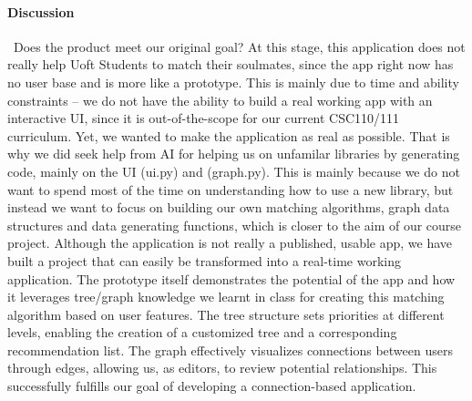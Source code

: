 \documentclass[fontsize=11pt]{article}
\begin{document}
\paragraph{Discussion}
\ Does the product meet our original goal?
At this stage, this application does not really help Uoft Students to match their soulmates, since the app right now has no user base and is more like a prototype.
This is mainly due to time and ability constraints -- we do not have the ability to build a real working app with an interactive UI, since it is out-of-the-scope for our current CSC110/111 curriculum. Yet, we wanted to make the application as real as possible. That is why we did seek help from AI for helping us on unfamilar libraries by generating code, mainly on the UI (ui.py) and (graph.py). This is mainly because we do not want to spend most of the time on understanding how to use a new library, but instead we want to focus on building our own matching algorithms, graph data structures and data generating functions, which is closer to the aim of our course project.
Although the application is not really a published, usable app, we have built a project that can easily be transformed into a real-time working application. The prototype itself demonstrates the potential of the app and how it leverages tree/graph knowledge we learnt in class for creating this matching algorithm based on user features. The tree structure sets priorities at different levels, enabling the creation of a customized tree and a corresponding recommendation list. The graph effectively visualizes connections between users through edges, allowing us, as editors, to review potential relationships. 
This successfully fulfills our goal of developing a connection-based application.
\end{document}
